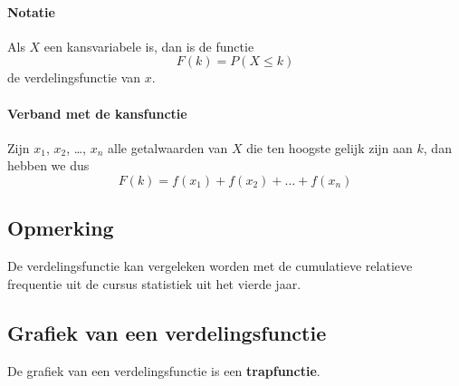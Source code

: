 \documentclass[12pt,twoside]{article}
\begin{document}
\paragraph*{Notatie}
Als $X$ een kansvariabele is, dan is de functie
$$F(k)=P(X\leq k)$$
de verdelingsfunctie van $x$.

\paragraph*{Verband met de kansfunctie}
Zijn $x_1$, $x_2$, \ldots, $x_n$ alle getalwaarden van $X$ die ten hoogste gelijk zijn aan $k$, dan hebben we dus
$$F(k) = f(x_1) + f(x_2) + \ldots + f(x_n)$$

\subsection{Opmerking}

De verdelingsfunctie kan vergeleken worden met de cumulatieve relatieve frequentie uit de cursus statistiek uit het vierde jaar.

\subsection{Grafiek van een verdelingsfunctie}

De grafiek van een verdelingsfunctie is een {\bf trapfunctie}.
\end{document}

